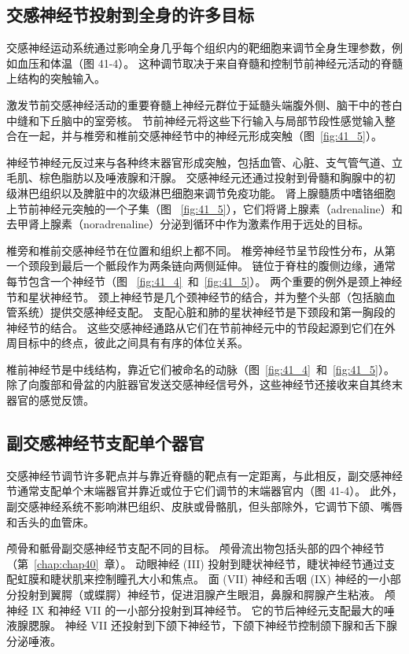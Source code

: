 \subsection{交感神经节投射到全身的许多目标}

交感神经运动系统通过影响全身几乎每个组织内的靶细胞来调节全身生理参数，例如血压和体温（图 41-4）。
这种调节取决于来自脊髓和控制节前神经元活动的脊髓上结构的突触输入。


激发节前交感神经活动的重要脊髓上神经元群位于延髓头端腹外侧、脑干中的苍白中缝和下丘脑中的室旁核。
节前神经元将这些下行输入与局部节段性感觉输入整合在一起，并与椎旁和椎前交感神经节中的神经元形成突触（图~\ref{fig:41_5}）。


神经节神经元反过来与各种终末器官形成突触，包括血管、心脏、支气管气道、立毛肌、棕色脂肪以及唾液腺和汗腺。
交感神经元还通过投射到骨髓和胸腺中的初级淋巴组织以及脾脏中的次级淋巴细胞来调节免疫功能。
肾上腺髓质中嗜铬细胞上节前神经元突触的一个子集（图 ~\ref{fig:41_5}），它们将肾上腺素（adrenaline）和去甲肾上腺素（noradrenaline）分泌到循环中作为激素作用于远处的目标。


椎旁和椎前交感神经节在位置和组织上都不同。
椎旁神经节呈节段性分布，从第一个颈段到最后一个骶段作为两条链向两侧延伸。
链位于脊柱的腹侧边缘，通常每节包含一个神经节（图 ~\ref{fig:41_4}~和~\ref{fig:41_5}）。
两个重要的例外是颈上神经节和星状神经节。
颈上神经节是几个颈神经节的结合，并为整个头部（包括脑血管系统）提供交感神经支配。
支配心脏和肺的星状神经节是下颈段和第一胸段的神经节的结合。
这些交感神经通路从它们在节前神经元中的节段起源到它们在外周目标中的终点，彼此之间具有有序的体位关系。


椎前神经节是中线结构，靠近它们被命名的动脉（图~\ref{fig:41_4}~和~\ref{fig:41_5}）。
除了向腹部和骨盆的内脏器官发送交感神经信号外，这些神经节还接收来自其终末器官的感觉反馈。



\subsection{副交感神经节支配单个器官}

交感神经节调节许多靶点并与靠近脊髓的靶点有一定距离，与此相反，副交感神经节通常支配单个末端器官并靠近或位于它们调节的末端器官内（图 41-4）。
此外，副交感神经系统不影响淋巴组织、皮肤或骨骼肌，但头部除外，它调节下颌、嘴唇和舌头的血管床。


颅骨和骶骨副交感神经节支配不同的目标。
颅骨流出物包括头部的四个神经节（第~\ref{chap:chap40}~章）。
动眼神经 (III) 投射到睫状神经节，睫状神经节通过支配虹膜和睫状肌来控制瞳孔大小和焦点。
面 (VII) 神经和舌咽 (IX) 神经的一小部分投射到翼腭（或蝶腭）神经节，促进泪腺产生眼泪，鼻腺和腭腺产生粘液。
颅神经 IX 和神经 VII 的一小部分投射到耳神经节。 它的节后神经元支配最大的唾液腺腮腺。
神经 VII 还投射到下颌下神经节，下颌下神经节控制颌下腺和舌下腺分泌唾液。


